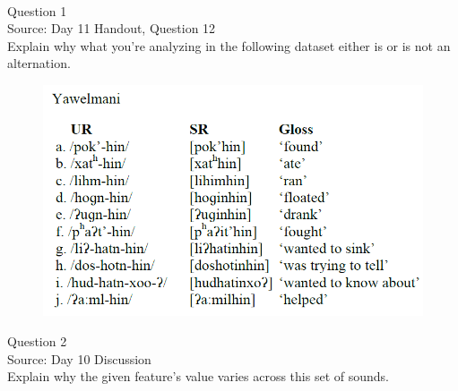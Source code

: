 \documentclass[12pt]{article}
\begin{document}
\newpage

\begin{center}
\textbf{{\color{red}{\HUGE END OF EXAM}}}\\

\end{center}
\newpage

\begin{center}
\textbf{{\color{blue}{\HUGE START OF EXAM\\}}}

\textbf{{\color{blue}{\HUGE Student ID: 7336\\}}}

\textbf{{\color{blue}{\HUGE 9:50 - 10:10 AM\\}}}

\end{center}
\newpage

{\large Question 1}\\

Source: Day 11 Handout, Question 12\\

Explain why what you’re analyzing in the following dataset either is or is not an alternation.\\

\begin{figure}[H]
\includegraphics{../images/yawelmani.png}
\end{figure}

\newpage

{\large Question 2}\\

Source: Day 10 Discussion\\

Explain why the given feature's value varies across this set of sounds.\\
\end{document}
